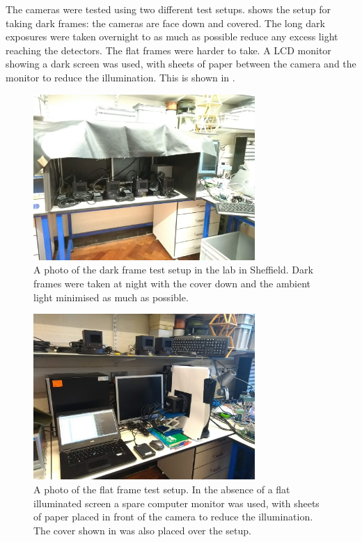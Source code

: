 \begin{colsection}
\begin{colsection}
The cameras were tested using two different test setups.  shows the setup for taking dark frames: the cameras are face down and covered. The long dark exposures were taken overnight to as much as possible reduce any excess light reaching the detectors. The flat frames were harder to take. A LCD monitor showing a dark screen was used, with sheets of paper between the camera and the monitor to reduce the illumination. This is shown in .

\begin{figure}[p]
    \begin{center}
        \includegraphics[width=0.75\textwidth]{images/dark_photo.jpg}
    \end{center}
    \caption[The dark frame test setup]{
        A photo of the dark frame test setup in the lab in Sheffield. Dark frames were taken at night with the cover down and the ambient light minimised as much as possible.
    }\label{fig:dark_photo}
\end{figure}

\begin{figure}[p]
    \begin{center}
        \includegraphics[width=0.75\textwidth]{images/flat_photo.jpg}
    \end{center}
    \caption[The flat frame test setup]{
        A photo of the flat frame test setup. In the absence of a flat illuminated screen a spare computer monitor was used, with sheets of paper placed in front of the camera to reduce the illumination. The cover shown in  was also placed over the setup.
    }\label{fig:flat_photo}
\end{figure}


\end{colsection}
\end{colsection}
